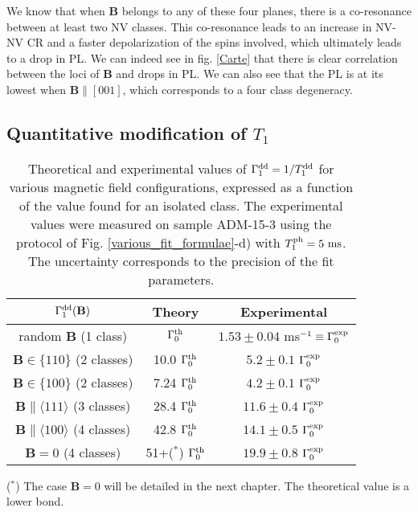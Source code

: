\documentclass[a4paper,11pt]{report}
\begin{document}
We know that when $\mathbf{B}$ belongs to any of these four planes, there is a co-resonance between at least two NV classes. This co-resonance leads to an increase in NV-NV CR and a faster depolarization of the spins involved, which ultimately leads to a drop in PL. We can indeed see in fig. \ref{Carte} that there is clear correlation between the loci of $\mathbf{B}$ and drops in PL. We can also see that the PL is at its lowest when $\mathbf{B}\parallel [001]$, which corresponds to a four class degeneracy.

\subsection{Quantitative modification of $T_1$}
\label{sec quantitative T1}
\begin{table}[htbp]
\centering
\caption{Theoretical and experimental values of $\Gamma_1^{\rm dd}=1/T_1^{\rm dd}$ for various magnetic field configurations, expressed as a function of the value found for an isolated class. The experimental values were measured on sample ADM-15-3 using the protocol of Fig. \ref{various_fit_formulae}-d) with $T_1^{\rm ph}= 5\ \rm ms$. The uncertainty corresponds to the precision of the fit parameters.}
 \label{T1 champ mag}
\begin{tabular}{c|cc}
\toprule
$\Gamma_1^{\rm dd} (\mathbf{B})$ &  Theory & Experimental \\
\midrule
random $\mathbf{B}$ (1 class) & $\Gamma_0^{\rm th}$ & $1.53\pm 0.04$ ms$^{-1} \equiv \Gamma_0^{\rm exp}$ \\
$\mathbf{B} \in \{110\}$ (2 classes) & 10.0 $\Gamma_0^{\rm th}$ & $5.2 \pm 0.1$ $\Gamma_0^{\rm exp}$ \\
$\mathbf{B} \in \{100\}$ (2 classes) & 7.24 $\Gamma_0^{\rm th}$ & $4.2 \pm 0.1$ $\Gamma_0^{\rm exp}$ \\
$\mathbf{B} \parallel \langle 111 \rangle$ (3 classes) & 28.4 $\Gamma_0^{\rm th}$ & $11.6 \pm 0.4$ $\Gamma_0^{\rm exp}$ \\
$\mathbf{B} \parallel \langle 100 \rangle$ (4 classes) & 42.8 $\Gamma_0^{\rm th}$ & $14.1 \pm 0.5$ $\Gamma_0^{\rm exp}$ \\
$\mathbf{B}=0$ (4 classes) & 51+($^*$) $\Gamma_0^{\rm th}$ & $19.9 \pm 0.8$ $\Gamma_0^{\rm exp}$ \\
\bottomrule
\end{tabular}

($^*$) The case $\mathbf{B}=0$ will be detailed in the next chapter. The theoretical value is a lower bond.
\end{table}
\end{document}
